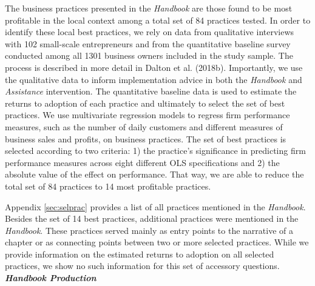 \documentclass[11.5pt]{article}
\begin{document}
The business practices presented in the \emph{Handbook} are those found to be most profitable in the local context among a total set of 84 practices tested. In order to identify these local best practices, we rely on data from qualitative interviews with 102 small-scale entrepreneurs and from the quantitative baseline survey conducted among all 1301 business owners included in the study sample. The process is described in more detail in Dalton et al. (2018b). Importantly, we use the qualitative data to inform implementation advice in both the \emph{Handbook} and \emph{Assistance} intervention. The quantitative baseline data is used to estimate the returns to adoption of each practice and ultimately to select the set of best practices. We use multivariate regression models to regress firm performance measures, such as the number of daily customers and different measures of business sales and profits, on business practices. The set of best practices is selected according to two criteria: 1) the practice's significance in predicting firm performance measures across eight different OLS specifications and 2) the absolute value of the effect on performance. That way, we are able to reduce the total set of 84 practices to 14 most profitable practices. %

Appendix \ref{sec:selprac} provides a list of all practices mentioned in the \emph{Handbook}. Besides the set of 14 best practices, additional practices were mentioned in the \emph{Handbook}. These practices served mainly as entry points to the narrative of a chapter or as connecting points between two or more selected practices. While we provide information on the estimated returns to adoption on all selected practices, we show no such information for this set of accessory questions. \\

\noindent \emph{\textbf{Handbook Production}}\
\end{document}
